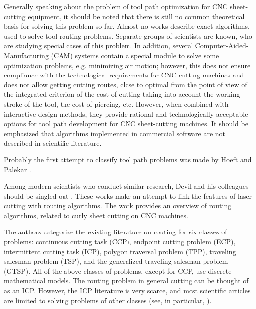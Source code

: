 Generally speaking about the problem of tool path optimization
for CNC sheet-cutting equipment, it should be noted that
there is still no common theoretical basis for solving this problem so far.
Almost no works describe exact algorithms,
used to solve tool routing problems.
Separate groups of scientists are known,
who are studying special cases of this problem.
In addition,
several Computer-Aided-Manufacturing (CAM) systems
contain a special module to solve some optimization problems,
e.g. minimizing air motion;
however, this does not ensure compliance
with the technological requirements for CNC cutting machines
and does not allow getting cutting routes,
close to optimal from the point of view of the integrated criterion of the cost of cutting
taking into account the working stroke of the tool,
the cost of piercing, etc.
However, when combined with interactive design methods,
they provide rational and technologically acceptable options
for tool path development for CNC sheet-cutting machines.
It should be emphasized that algorithms implemented in commercial software
are not described in scientific literature.

Probably the first attempt to classify tool path problems was made by Hoeft and Palekar \cite{bibx:306}.


Among modern scientists who conduct similar research, Devil and his colleagues should be singled out \cite{bibx:100, bibx:109, bibx:110, bibx:307}.
These works make an attempt to link the features of laser cutting with routing algorithms.
The work \cite{bibx:109} provides an overview of routing algorithms,
related to curly sheet cutting on CNC machines.

The authors categorize the existing literature on routing
for six classes of problems:
continuous cutting task (CCP),
endpoint cutting problem (ECP),
intermittent cutting task (ICP),
polygon traversal problem (TPP),
traveling salesman problem (TSP),
and the generalized traveling salesman problem (GTSP).
All of the above classes of problems, except for CCP, use discrete mathematical models.
The routing problem in general cutting can be thought of as an ICP.
However, the ICP literature is very scarce,
and most scientific articles are limited to solving problems of other classes (see, in particular, \cite{bibx:301}).

